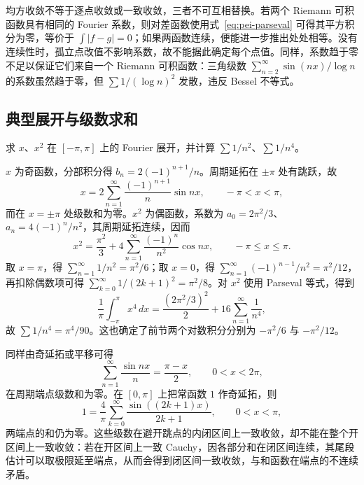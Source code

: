 均方收敛不等于逐点收敛或一致收敛，三者不可互相替换。若两个 Riemann 可积函数具有相同的 Fourier 系数，则对差函数使用式~\eqref{eq:pei-parseval} 可得其平方积分为零，等价于 $\int|f-g|=0$；如果两函数连续，便能进一步推出处处相等。没有连续性时，孤立点改值不影响系数，故不能据此确定每个点值。同样，系数趋于零不足以保证它们来自一个 Riemann 可积函数：三角级数 $\sum_{n=2}^{\infty}\sin(nx)/\log n$ 的系数虽然趋于零，但 $\sum1/(\log n)^2$ 发散，违反 Bessel 不等式。

\subsection{典型展开与级数求和}

\begin{example}
\label{ex:pei-fourier-sums}
求 $x$、$x^2$ 在 $[-\pi,\pi]$ 上的 Fourier 展开，并计算 $\sum1/n^2$、$\sum1/n^4$。
\end{example}
\begin{solve}
$x$ 为奇函数，分部积分得 $b_n=2(-1)^{n+1}/n$。周期延拓在 $\pm\pi$ 处有跳跃，故
\[
 x=2\sum_{n=1}^{\infty}\frac{(-1)^{n+1}}n\sin nx,\qquad -\pi<x<\pi,
\]
而在 $x=\pm\pi$ 处级数和为零。$x^2$ 为偶函数，系数为 $a_0=2\pi^2/3$、$a_n=4(-1)^n/n^2$，其周期延拓连续，因而
\begin{equation}
 x^2=\frac{\pi^2}{3}+4\sum_{n=1}^{\infty}\frac{(-1)^n}{n^2}\cos nx,
 \qquad -\pi\leq x\leq\pi.
 \label{eq:pei-x-square-fourier}
\end{equation}
取 $x=\pi$，得 $\sum_{n=1}^{\infty}1/n^2=\pi^2/6$；取 $x=0$，得 $\sum_{n=1}^{\infty}(-1)^{n-1}/n^2=\pi^2/12$，再扣除偶数项可得 $\sum_{k=0}^{\infty}1/(2k+1)^2=\pi^2/8$。对 $x^2$ 使用 Parseval 等式，得到
\[
 \frac1\pi\int_{-\pi}^{\pi}x^4\,dx
 =\frac{(2\pi^2/3)^2}{2}+16\sum_{n=1}^{\infty}\frac1{n^4},
\]
故 $\sum1/n^4=\pi^4/90$。这也确定了前节两个对数积分分别为 $-\pi^2/6$ 与 $-\pi^2/12$。
\end{solve}

同样由奇延拓或平移可得
\begin{equation}
 \sum_{n=1}^{\infty}\frac{\sin nx}{n}=\frac{\pi-x}{2},\qquad0<x<2\pi,
 \label{eq:pei-sawtooth-fourier}
\end{equation}
在周期端点级数和为零。在 $[0,\pi]$ 上把常函数 $1$ 作奇延拓，则
\[
 1=\frac4\pi\sum_{k=0}^{\infty}\frac{\sin((2k+1)x)}{2k+1},\qquad0<x<\pi,
\]
两端点的和仍为零。这些级数在避开跳点的内闭区间上一致收敛，却不能在整个开区间上一致收敛：若在开区间上一致 Cauchy，因各部分和在闭区间连续，其尾段估计可以取极限延至端点，从而会得到闭区间一致收敛，与和函数在端点的不连续矛盾。


